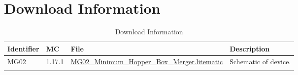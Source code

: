 \documentclass[10pt]{datasheet}
\begin{document}
\section{Download Information}
\begin{table}[H]
    \caption{Download Information}
    \begin{tabularx}{\textwidth}{l | l | l | X}
        \thickhline
        \textbf{Identifier} & \textbf{MC} & \textbf{File} & \textbf{Description} \\
        \hline
        MG02 & 1.17.1 & \href{https://github.com/Soontech-Annals/Archive/blob/2b73adfd252c5e2cf9d202454dbef78a586bc482/Archive/merging/MG02\%20Minimum\%20Hopper\%20Box\%20Merger/MG02\_Minimum\_Hopper\_Box\_Merger.litematic?raw=1}{MG02\_Minimum\_Hopper\_Box\_Merger.litematic} & Schematic of device. \\
        \hline
        \thickhline
    \end{tabularx}
\end{table}
\end{document}
